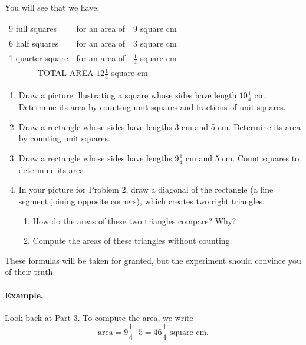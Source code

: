 \documentclass[12pt]{book} %
\begin{document}
You will see that we have:
\begin{center}
\begin{tabular}{lll}
9 full squares & for an area of & 9 square cm \\
6 half squares & for an area of & 3 square cm \\
1 quarter square & for an area of & $\frac14$ square cm \\
\multicolumn{3}{c}{TOTAL AREA \qquad $12\frac14$ square cm}
\end{tabular}
\end{center}

\begin{enumerate}
\item Draw a picture illustrating a square whose sides have length $10\frac14$ cm. Determine its area by counting unit squares and fractions of unit squares.

\item Draw a rectangle whose sides have lengths 3 cm and 5 cm. Determine its area by counting unit squares.

\item Draw a rectangle whose sides have lengths $9\frac14$ cm and 5 cm. Count squares to determine its area.

\item In your picture for Problem 2, draw a diagonal of the rectangle (a line segment joining opposite corners), which creates two right triangles.
\begin{enumerate}
\item[(a)] How do the areas of these two triangles compare? Why?
\item[(b)] Compute the areas of these triangles without counting.
\end{enumerate}
\end{enumerate}


These formulas will be taken for granted, but the experiment should convince you of their truth.

\paragraph{Example.}
Look back at Part 3. To compute the area, we write
\[
\text{area}=9\frac14\cdot 5=46\frac14 \text{ square cm.}
\]
\end{document}
